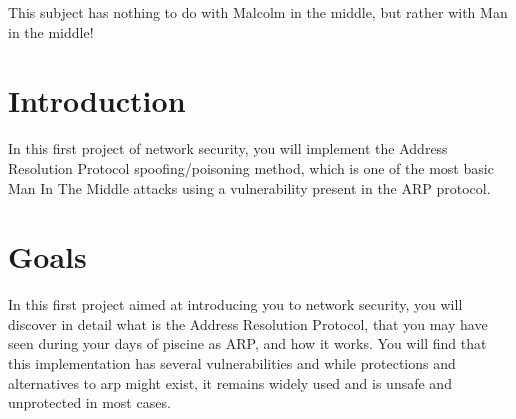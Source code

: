 \documentclass{42-en}
\begin{document}
    This subject has nothing to do with Malcolm in the middle, but rather with Man in the middle!\\
    \newpage
    
\chapter{Introduction}

    In this first project of network security, 
     you will implement the Address Resolution Protocol spoofing/poisoning method, which is one of the most basic Man In The Middle attacks 
     using a vulnerability present in the ARP protocol.



\chapter{Goals}

    In this first project aimed at introducing you to network security,
     you will discover in detail what is the Address Resolution Protocol,
      that you may have seen during your days of piscine as ARP, and how it 
      works. You will find that this implementation has several vulnerabilities 
      and while protections and alternatives to arp might exist,
       it remains widely used and is unsafe and unprotected in most cases.


\end{document}
